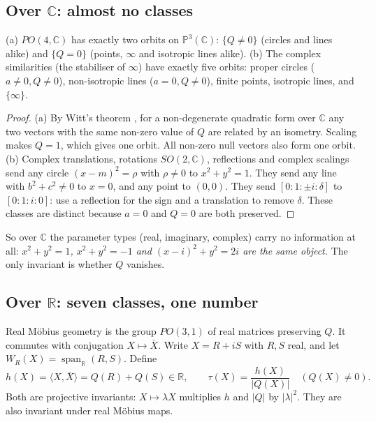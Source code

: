 \documentclass[11pt]{article}
\theoremstyle{definition}\newtheorem{definition}[theorem]{Definition}\newtheorem{remark}[theorem]{Remark}\newtheorem{example}[theorem]{Example}
\newcommand{\C}{\mathbb{C}}\newcommand{\R}{\mathbb{R}}\newcommand{\PP}{\mathbb{P}}
\newcommand{\ip}[2]{\langle #1,#2\rangle}\newcommand{\pt}{\mathrm{pt}}\newcommand{\Qd}{\mathcal{Q}}
\begin{document}
\subsection{Over $\C$: almost no classes}
\begin{proposition}\label{prop:complexorbits}
(a) $PO(4,\C)$ has exactly two orbits on $\PP^3(\C)$: $\{Q\neq0\}$ (circles and lines alike) and $\{Q=0\}$ (points, $\infty$ and isotropic lines alike).
(b) The complex similarities (the stabiliser of $\infty$) have exactly five orbits: proper circles ($a\neq0,Q\neq0$), non-isotropic lines ($a=0,Q\neq0$), finite points, isotropic lines, and $\{\infty\}$.
\end{proposition}
\begin{proof}
(a) By Witt's theorem \cite{Witt}, for a non-degenerate quadratic form over $\C$ any two vectors with the same non-zero value of $Q$ are related by an isometry. Scaling makes $Q=1$, which gives one orbit. All non-zero null vectors also form one orbit.
(b) Complex translations, rotations $SO(2,\C)$, reflections and complex scalings send any circle $(x-m)^2=\rho$ with $\rho\neq0$ to $x^2+y^2=1$. They send any line with $b^2+c^2\neq0$ to $x=0$, and any point to $(0,0)$. They send $[0:1:\pm i:\delta]$ to $[0:1:i:0]$: use a reflection for the sign and a translation to remove $\delta$. These classes are distinct because $a=0$ and $Q=0$ are both preserved.
\end{proof}
So over $\C$ the parameter types (real, imaginary, complex) carry no information at all: \emph{$x^2+y^2=1$, $x^2+y^2=-1$ and $(x-i)^2+y^2=2i$ are the same object.} The only invariant is whether $Q$ vanishes.

\subsection{Over $\R$: seven classes, one number}
Real Möbius geometry is the group $PO(3,1)$ of real matrices preserving $Q$. It commutes with conjugation $X\mapsto\bar X$. Write $X=R+iS$ with $R,S$ real, and let $W_R(X)=\operatorname{span}_\R(R,S)$. Define
\[h(X)=\ip X{\bar X}=Q(R)+Q(S)\in\R,\qquad \tau(X)=\frac{h(X)}{|Q(X)|}\quad(Q(X)\neq0).\]
Both are projective invariants: $X\mapsto\lambda X$ multiplies $h$ and $|Q|$ by $|\lambda|^2$. They are also invariant under real Möbius maps.
\end{document}
